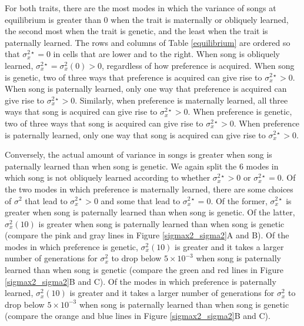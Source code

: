 \documentclass{article}
\begin{document}
For both traits, there are the most modes in which the variance of songs at equilibrium is greater than $0$ when the trait is maternally or obliquely learned, the second most when the trait is genetic, and the least when the trait is paternally learned. The rows and columns of Table \ref{equilibrium} are ordered so that $\sigma_x^{2\star}=0$ in cells that are lower and to the right. When song is obliquely learned, $\sigma_x^{2\star}=\sigma_x^2(0)>0$, regardless of how preference is acquired. When song is genetic, two of three ways that preference is acquired can give rise to $\sigma_x^{2\star}>0$. When song is paternally learned, only one way that preference is acquired can give rise to $\sigma_x^{2\star}>0$. Similarly, when preference is maternally learned, all three ways that song is acquired can give rise to $\sigma_x^{2\star}>0$. When preference is genetic, two of three ways that song is acquired can give rise to $\sigma_x^{2\star}>0$. When preference is paternally learned, only one way that song is acquired can give rise to $\sigma_x^{2\star}>0$.  

Conversely, the actual amount of variance in songs is greater when song is paternally learned than when song is genetic. We again split the $6$ modes in which song is not obliquely learned according to whether $\sigma_x^{2\star}>0$ or $\sigma_x^{2\star}=0$. Of the two modes in which preference is maternally learned, there are some choices of $\sigma^2$ that lead to $\sigma_x^{2\star}>0$ and some that lead to $\sigma_x^{2\star}=0$. Of the former, $\sigma_x^{2\star}$ is greater when song is paternally learned than when song is genetic. Of the latter, $\sigma_x^2(10)$ is greater when song is paternally learned than when song is genetic (compare the pink and gray lines in Figure \ref{sigmax2_sigma2}A and B). Of the modes in which preference is genetic, $\sigma_x^2(10)$ is greater and it takes a larger number of generations for $\sigma_x^2$ to drop below $5\times10^{-3}$ when song is paternally learned than when song is genetic (compare the green and red lines in Figure \ref{sigmax2_sigma2}B and C). Of the modes in which preference is paternally learned, $\sigma_x^2(10)$ is greater and it takes a larger number of generations for $\sigma_x^2$ to drop below $5\times10^{-3}$ when song is paternally learned than when song is genetic (compare the orange and blue lines in Figure \ref{sigmax2_sigma2}B and C).

\end{document}
